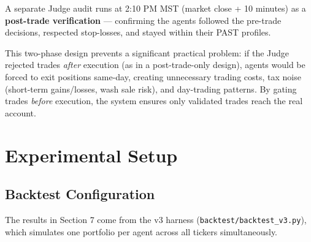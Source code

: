 \documentclass[11pt]{article}
\begin{document}
A separate Judge audit runs at 2:10 PM MST (market close + 10 minutes) as a \textbf{post-trade verification} --- confirming the agents followed the pre-trade decisions, respected stop-losses, and stayed within their PAST profiles.

This two-phase design prevents a significant practical problem: if the Judge rejected trades \emph{after} execution (as in a post-trade-only design), agents would be forced to exit positions same-day, creating unnecessary trading costs, tax noise (short-term gains/losses, wash sale risk), and day-trading patterns. By gating trades \emph{before} execution, the system ensures only validated trades reach the real account.

\section{Experimental Setup}\label{experimental-setup}

\subsection{Backtest Configuration}\label{backtest-configuration}

The results in Section 7 come from the v3 harness (\texttt{backtest/backtest\_v3.py}), which simulates one portfolio per agent across all tickers simultaneously.
\end{document}
